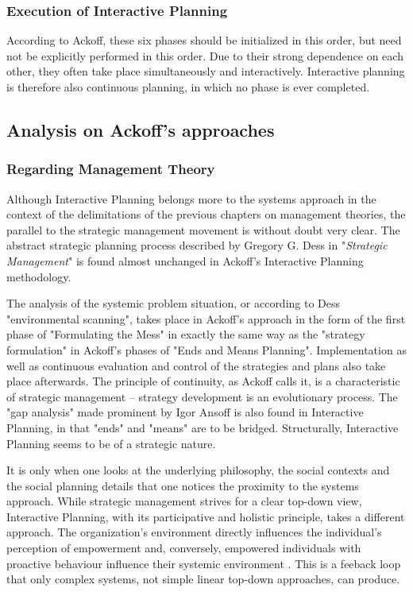 \documentclass[a4paper,12pt]{article}
\begin{document}
\subsubsection{Execution of Interactive Planning}

According to Ackoff, these six phases should be initialized in this order, but
need not be explicitly performed in this order. Due to their strong dependence
on each other, they often take place simultaneously and interactively.
Interactive planning is therefore also continuous planning, in which no phase
is ever completed.

\subsection{Analysis on Ackoff's approaches}

\subsubsection{Regarding Management Theory}	

Although Interactive Planning belongs more to the systems approach in the
context of the delimitations of the previous chapters on management theories,
the parallel to the strategic management movement is without doubt very clear.
The abstract strategic planning process described by Gregory G. Dess in
"\textit{Strategic Management}" \cite{dess:1993} is found almost unchanged in
Ackoff's Interactive Planning methodology.

The analysis of the systemic problem situation, or according to Dess
"environmental scanning", takes place in Ackoff's approach in the form of the
first phase of "Formulating the Mess" in exactly the same way as the "strategy
formulation" in Ackoff's phases of "Ends and Means Planning". Implementation
as well as continuous evaluation and control of the strategies and plans also
take place afterwards. The principle of continuity, as Ackoff calls it, is a
characteristic of strategic management -- strategy development is an
evolutionary process. The "gap analysis" made prominent by Igor Ansoff is also
found in Interactive Planning, in that "ends" and "means" are to be bridged.
Structurally, Interactive Planning seems to be of a strategic nature.

It is only when one looks at the underlying philosophy, the social contexts
and the social planning details that one notices the proximity to the systems
approach. While strategic management strives for a clear top-down view,
Interactive Planning, with its participative and holistic principle, takes a
different approach. The organization's environment directly influences the
individual's perception of empowerment and, conversely, empowered individuals
with proactive behaviour influence their systemic environment
\cite{wilbon:2012}.  This is a feeback loop that only complex systems, not
simple linear top-down approaches, can produce.
\end{document}
